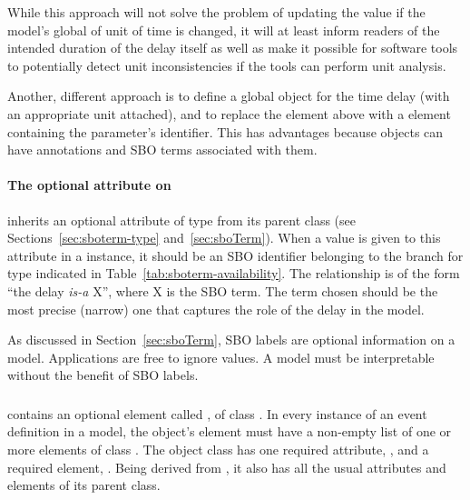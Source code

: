 While this approach will not solve the problem of updating the
value if the model's global of unit of time is changed, it will at
least inform readers of the intended duration of the delay itself
as well as make it possible for software tools to potentially
detect unit inconsistencies if the tools can perform unit
analysis.

Another, different approach is to define a global \Parameter
object for the time delay (with an appropriate unit attached), and
to replace the  element above with a  element
containing the parameter's identifier.  This has advantages
because \Parameter objects can have annotations and SBO terms
associated with them.


\paragraph{The optional  attribute on }
\label{sec:delay-sboterm}

\Delay  inherits an optional 
attribute of type  from its parent
class \SBase (see Sections~\ref{sec:sboterm-type}
and~\ref{sec:sboTerm}).  When a value is given to this
attribute in a  \Delay instance, it should be an
SBO identifier belonging to the branch for type  \Delay
indicated in Table~\ref{tab:sboterm-availability}.  The relationship is
of the form ``the delay \emph{is-a} X'', where X is
the SBO term.  The term chosen should be the most precise (narrow)
one that captures the role of the delay  in the model.

As discussed in Section~\ref{sec:sboTerm}, SBO labels are optional
information on a model.  Applications are free to ignore
 values.  A model must be interpretable without the
benefit of SBO labels.



\subsubsection{}
\label{sec:eventassignment}
\label{sec:listofeventassignments}

\Event contains an optional element called
, of class \ListOfEventAssignments.
In every instance of an event definition in a model, the object's
 element must have a non-empty list
of one or more  elements of class
\EventAssignment.  The object class \EventAssignment has one
required attribute, , and a required element,
.  Being derived from \SBase, it also has all the
usual attributes and elements of its parent class.

